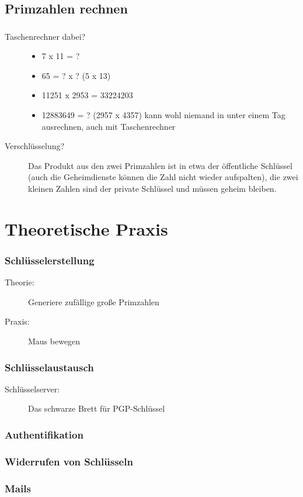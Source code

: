 \documentclass[compress]{beamer}
\begin{document}
\subsection{Primzahlen rechnen}
\begin{frame}
  \frametitle{\insertsubsection}
  \begin{description}
  \item[Taschenrechner dabei?]
    \begin{itemize}
    \item 7 x 11 = ?
    \item 65 = ? x ? (5 x 13)
    \item 11251 x 2953 = 33224203
    \item 12883649 = ? (2957 x 4357) kann wohl niemand in unter einem
      Tag ausrechnen, auch mit Taschenrechner
    \end{itemize}
  \item[Verschlüsselung?] Das Produkt aus den zwei Primzahlen ist in
    etwa der öffentliche Schlüssel (auch die Geheimdienste können die
    Zahl nicht wieder aufspalten), die zwei kleinen Zahlen sind der
    private Schlüssel und müssen geheim bleiben.
  \end{description}
\end{frame}

\section{Theoretische Praxis}
\label{sec-1-1-4}

\begin{frame}
    \frametitle{Schlüsselerstellung}
    \begin{description}
        \item[Theorie:] Generiere zufällige große Primzahlen
        \item[Praxis:] Maus bewegen
    \end{description}
\end{frame}
\begin{frame}
    \frametitle{Schlüsselaustausch}
    \begin{description}
        \item[Schlüsselserver: ] Das schwarze Brett für PGP-Schlüssel
    \end{description}
\end{frame}
\begin{frame}
    \frametitle{Authentifikation}
\end{frame}
\begin{frame}
    \frametitle{Widerrufen von Schlüsseln}
\end{frame}
\begin{frame}
    \frametitle{Mails}
\end{frame}
\end{document}

